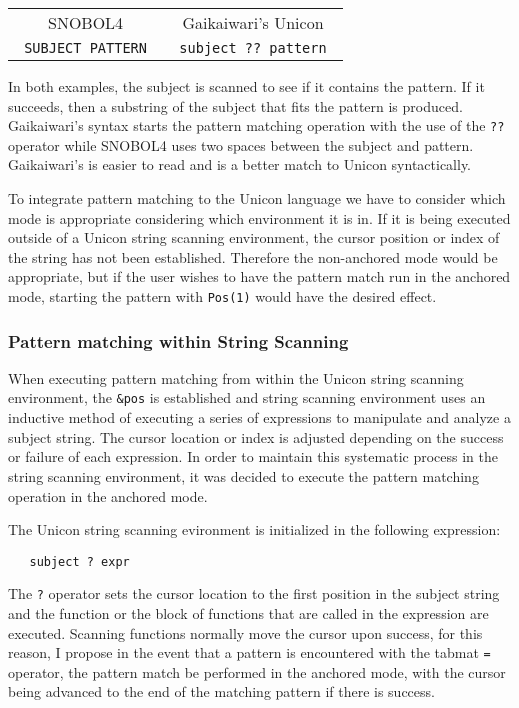 \documentclass{article}
\begin{document}
\begin{table}[ht]
	\centering
	\begin{tabular}{c c}
		SNOBOL4 & Gaikaiwari's Unicon \\
		\texttt{ SUBJECT  PATTERN }& 
		
		\texttt{ subject ?? pattern }

	\end{tabular}
\end{table}
\noindent
In both examples, the subject is scanned to see if it contains the pattern.  If it succeeds, then a substring of the subject that fits the pattern is produced.  Gaikaiwari's syntax starts the pattern matching operation with the use of the \texttt{??} operator while SNOBOL4 uses two spaces between the subject and pattern.  Gaikaiwari's is easier to read and is a better match to Unicon syntactically.   

To integrate pattern matching to the Unicon language we have to consider which mode is appropriate considering which environment it is in.  If it is being executed outside of a Unicon string scanning environment, the cursor position or index of the string has not been established.  Therefore the non-anchored mode would be appropriate, but if the user wishes to have the pattern match run in the anchored mode, starting the pattern with \texttt{Pos(1)} would have the desired effect.

\subsubsection{Pattern matching within String Scanning}
When executing pattern matching from within the Unicon string scanning environment, the \texttt{\&pos} is established and string scanning environment uses an inductive method of executing a series of expressions to manipulate and analyze a subject string.  The cursor location or index is adjusted depending on the success or failure of each expression.  In order to maintain this systematic process in the string scanning environment, it was decided to execute the pattern matching operation in the anchored mode.  

The Unicon string scanning evironment is initialized in the following expression:

\begin{verbatim}
   subject ? expr
\end{verbatim}

The \texttt{?} operator sets the cursor location to the first position in the subject string and the function or the block of functions that are called in the expression are executed.  Scanning functions normally move the cursor upon success, for this reason, I propose in the event that a pattern is encountered with the tabmat \texttt{=} operator, the pattern match be performed in the anchored mode, with the cursor being advanced to the end of the matching pattern if there is success.
\end{document}
